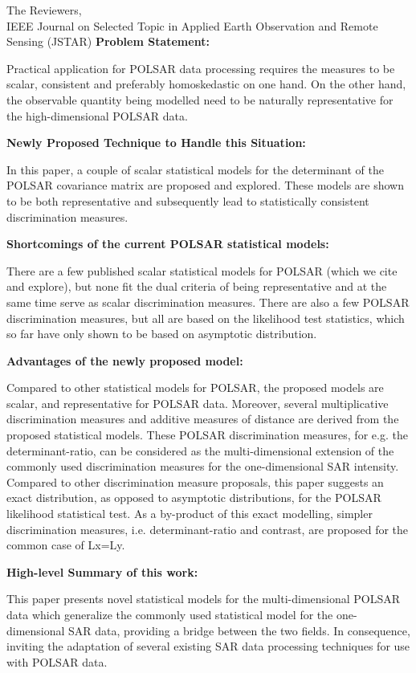 \documentclass{letter}
\begin{document}
\begin{letter}{The Reviewers,\\IEEE Journal on Selected Topic in Applied Earth Observation and Remote Sensing (JSTAR)}
\textbf{Problem Statement:}

Practical application for POLSAR data processing requires the measures to be scalar, consistent and preferably homoskedastic on one hand.
On the other hand, the observable quantity being modelled need to be naturally representative for the high-dimensional POLSAR data.

\textbf{Newly Proposed Technique to Handle this Situation:}

In this paper, a couple of scalar statistical models for the determinant of the POLSAR covariance matrix are proposed and explored.
These models are shown to be both representative and subsequently lead to statistically consistent discrimination measures.

\textbf{Shortcomings of the current POLSAR statistical models:}

There are a few published scalar statistical models for POLSAR (which we cite and explore), but none fit the dual criteria of being representative and at the same time serve as scalar discrimination measures.
There are also a few POLSAR discrimination measures, but all are based on the likelihood test statistics, which so far have only shown to be based on asymptotic distribution.

\textbf{Advantages of the newly proposed model:}

Compared to other statistical models for POLSAR, the proposed models are scalar, and representative for POLSAR data.
Moreover, several multiplicative discrimination measures and additive measures of distance are derived from the proposed statistical models.
These POLSAR discrimination measures, for e.g. the determinant-ratio, can be considered as the multi-dimensional extension of the commonly used discrimination measures for the one-dimensional SAR intensity.
Compared to other discrimination measure proposals, this paper suggests an exact distribution, as opposed to asymptotic distributions, for the POLSAR likelihood statistical test.
As a by-product of this exact modelling, simpler discrimination measures, i.e. determinant-ratio and contrast, are proposed for the common case of Lx=Ly.

\textbf{High-level Summary of this work:}

This paper presents novel statistical models for the multi-dimensional POLSAR data which generalize the commonly used statistical model for the one-dimensional SAR data, providing a bridge between the two fields. In consequence, inviting the adaptation of several existing SAR data processing techniques for use with POLSAR data.

\end{letter}
 
\end{document}
